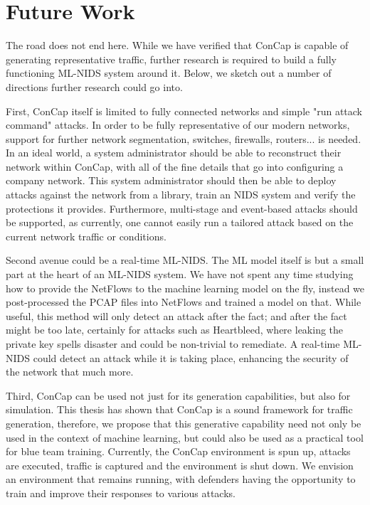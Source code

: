 \section{Future Work}

The road does not end here. While we have verified that ConCap is capable of generating representative traffic, further research is required to build a fully functioning ML-NIDS system around it. Below, we sketch out a number of directions further research could go into.

First, ConCap itself is limited to fully connected networks and simple "run attack command" attacks. In order to be fully representative of our modern networks, support for further network segmentation, switches, firewalls, routers... is needed. In an ideal world, a system administrator should be able to reconstruct their network within ConCap, with all of the fine details that go into configuring a company network. This system administrator should then be able to deploy attacks against the network from a library, train an NIDS system and verify the protections it provides. Furthermore, multi-stage and event-based attacks should be supported, as currently, one cannot easily run a tailored attack based on the current network traffic or conditions.

Second avenue could be a real-time ML-NIDS. The ML model itself is but a small part at the heart of an ML-NIDS system. We have not spent any time studying how to provide the NetFlows to the machine learning model on the fly, instead we post-processed the PCAP files into NetFlows and trained a model on that. While useful, this method will only detect an attack after the fact; and after the fact might be too late, certainly for attacks such as Heartbleed, where leaking the private key spells disaster and could be non-trivial to remediate. A real-time ML-NIDS could detect an attack while it is taking place, enhancing the security of the network that much more.

Third, ConCap can be used not just for its generation capabilities, but also for simulation. This thesis has shown that ConCap is a sound framework for traffic generation, therefore, we propose that this generative capability need not only be used in the context of machine learning, but could also be used as a practical tool for blue team training. Currently, the ConCap environment is spun up, attacks are executed, traffic is captured and the environment is shut down. We envision an environment that remains running, with defenders having the opportunity to train and improve their responses to various attacks.